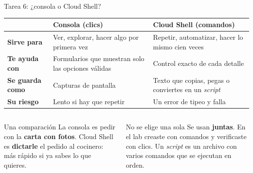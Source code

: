 \documentclass[aspectratio=169,10pt,c]{beamer}
\begin{document}
\begin{frame}{Tarea 6: ¿consola o Cloud Shell?}
\renewcommand{\arraystretch}{1.3}
\centering\small
\begin{tabular}{@{}p{2.6cm}p{5.2cm}p{5.2cm}@{}}
\toprule
 & \textbf{Consola (clics)} & \textbf{Cloud Shell (comandos)}\\
\midrule
\textbf{Sirve para} & Ver, explorar, hacer algo por primera vez & Repetir, automatizar, hacer lo mismo cien veces\\
\textbf{Te ayuda con} & Formularios que muestran solo las opciones válidas & Control exacto de cada detalle\\
\textbf{Se guarda como} & Capturas de pantalla & Texto que copias, pegas o conviertes en un \emph{script}\\
\textbf{Su riesgo} & Lento si hay que repetir & Un error de tipeo y falla\\
\bottomrule
\end{tabular}
\par\vspace{3mm}
\begin{columns}[T,onlytextwidth]
\begin{exampleblock}{Una comparación}
\small La consola es pedir con la \textbf{carta con fotos}. Cloud Shell es \textbf{dictarle} el pedido al cocinero: más rápido si ya sabes lo que quieres.
\end{exampleblock}
\begin{alertblock}{No se elige una sola}
\small Se usan \textbf{juntas}. En el lab creaste con comandos y verificaste con clics. Un \emph{script} es un archivo con varios comandos que se ejecutan en orden.
\end{alertblock}
\end{columns}
\end{frame}
\end{document}
